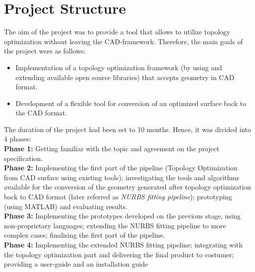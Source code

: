 \section{Project Structure}
The aim of the project was to provide a tool that allows to utilize topology optimization without leaving the CAD-framework. Therefore, the main goals of the project were as follows:
\begin{itemize}
\item Implementation of a topology optimization framework (by using and extending available open source libraries) that accepts geometry in CAD format.
\item Development of a flexible tool for conversion of an optimized surface back to the CAD format.
\end{itemize}

The duration of the project had been set to 10 months. Hence, it was divided into 4 phases:\\

\textbf{Phase 1:} Getting familiar with the topic and agreement on the project specification.\\

\textbf{Phase 2:} Implementing the first part of the pipeline (Topology Optimization from CAD surface using existing tools); investigating the tools and algorithms available for the conversion of the geometry generated after topology optimization back to CAD format (later referred as \emph{NURBS fitting pipeline}); prototyping (using MATLAB) and evaluating results.\\

\textbf{Phase 3:} Implementing the prototypes developed on the previous stage, using non-proprietary languages; extending the NURBS fitting pipeline to more complex cases; finalising the first part of the pipeline.\\

\textbf{Phase 4:} Implementing the extended NURBS fitting pipeline; integrating with the topology optimization part and delivering the final product to costumer; providing a user-guide and an installation guide
